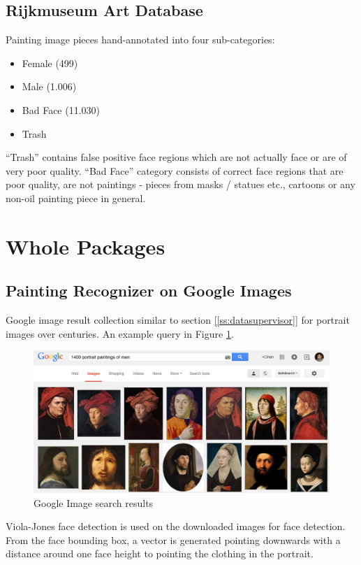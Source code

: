 \documentclass[runningheads]{llncs}
\begin{document}
\subsection{Rijkmuseum Art Database}\label{ss-dbRijk}
Painting\cite{rijksmuseum1976tot} image pieces hand-annotated into four sub-categories:

\begin{itemize}
	\item Female (499)
	\item Male (1.006)
	\item Bad Face (11.030)
	\item Trash
\end{itemize}

“Trash” contains false positive face regions which are not actually face or are of very poor quality. “Bad Face” category consists of correct face regions that are poor quality, are not paintings - pieces from masks / statues etc., cartoons or any non-oil painting piece in general.


\section{Whole Packages}

\subsection{Painting Recognizer on Google Images}

Google image result collection similar to section \ref{[ss:datasupervisor]} for portrait images over centuries. An example query in Figure \ref{pr-googleres}.

\begin{figure}
	\centering
	\includegraphics[width=.8\textwidth]{PaintingRecognizer-query_results}
	\caption{Google Image search results}
	\label{pr-googleres}	
\end{figure}

Viola-Jones\cite{viola} face detection is used on the downloaded images for face detection. From the face bounding box, a vector is generated pointing downwards with a distance around one face height to pointing the clothing in the portrait.
\end{document}
